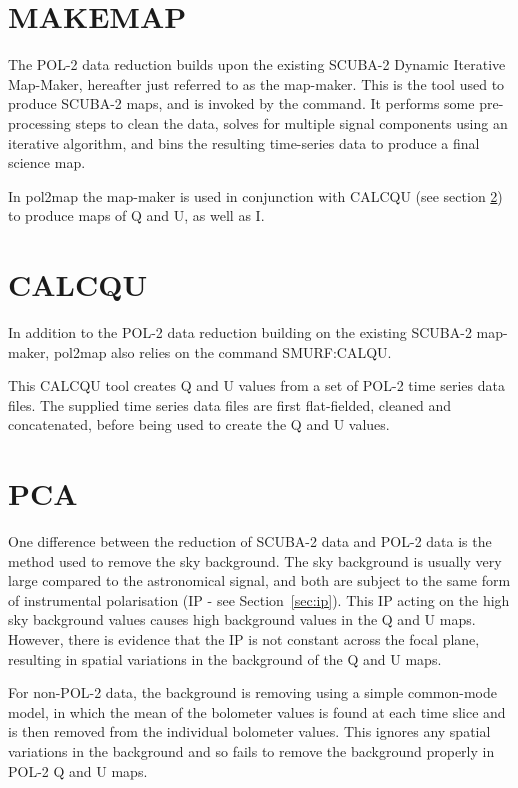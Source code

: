 \section{MAKEMAP}

The POL-2 data reduction builds upon the existing SCUBA-2 Dynamic
Iterative Map-Maker, hereafter just referred to as the map-maker. This
is the tool used to produce SCUBA-2 maps, and is invoked by the
 command. It performs some
pre-processing steps to clean the data, solves for multiple signal
components using an iterative algorithm, and bins the resulting
time-series data to produce a final science map.

In pol2map the map-maker is used in conjunction with CALCQU (see
section \ref{sec:calcqu}) to produce maps of Q and U, as well as I.

\section{CALCQU}
\label{sec:calcqu}

In addition to the POL-2 data reduction building on the
existing SCUBA-2 map-maker, pol2map also relies on the command
SMURF:CALQU.

This CALCQU tool creates Q and U values from a set of POL-2 time
series data files. The supplied time series data files are first
flat-fielded, cleaned and concatenated, before being used to create
the Q and U values.


\section{PCA}
\label{sec:pca}

One difference between the reduction of SCUBA-2 data and POL-2 data is the
method used to remove the sky background.  The sky background is usually
very large compared to the astronomical signal, and both are subject to
the same form of instrumental polarisation (IP - see Section~\ref{sec:ip}).
This
IP acting on the high sky background values causes high background values
in the Q and U maps. However, there is evidence that the IP is not
constant across the focal plane, resulting in spatial variations in the
background of the Q and U maps.

For non-POL-2 data, the background is removing using a simple common-mode
model, in which the mean of the bolometer values is found at each time
slice and is then removed from the individual bolometer values. This
ignores any spatial variations in the background and so fails to remove
the background properly in POL-2 Q and U maps.


